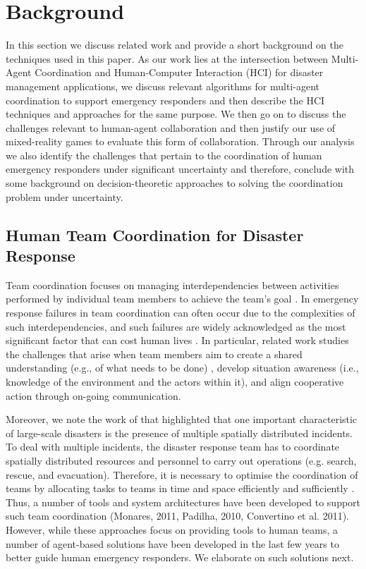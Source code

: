 \section{Background}
In this section we discuss related work and provide a short background on the techniques used in this paper.  As our work lies at the intersection between Multi-Agent Coordination and Human-Computer Interaction (HCI) for disaster management applications, we discuss relevant algorithms for multi-agent coordination to support emergency responders and then describe the HCI techniques and approaches for the same purpose. We then go on to discuss the challenges relevant to human-agent collaboration and then justify our use of mixed-reality games to evaluate this form of collaboration.  Through our analysis we also identify the challenges that pertain to the coordination of human emergency responders under significant uncertainty and therefore, conclude with some background on decision-theoretic approaches to solving the coordination problem under uncertainty.



\subsection{Human Team Coordination for Disaster Response}
Team coordination focuses on managing interdependencies between activities performed  by individual team members to achieve the team's goal \cite[p. 361]{Malone:1990}. In emergency response failures in team coordination can often occur due to the complexities of such interdependencies, and such failures are widely acknowledged as the most significant factor that can cost human lives \cite[p. 2]{Toups et al., 2011}. In particular, related work studies the challenges that arise when team members aim to create a shared understanding (e.g., of what needs to be done) \cite{Convertino2010}, develop situation awareness (i.e., knowledge of the environment and the actors within it), and align cooperative action through on-going communication.  

Moreover, we note the work of \cite{chen:Etal:2005} that highlighted that one important characteristic of large-scale disasters is the presence of multiple spatially distributed incidents. To deal with multiple incidents, the disaster response team has to coordinate spatially distributed resources and personnel to carry out operations (e.g. search, rescue, and evacuation). Therefore, it is necessary to optimise the coordination of teams by allocating tasks to teams in time and space efficiently and sufficiently \cite{Nourjou et al 2011}. Thus, a number of tools and system architectures have been developed to support such team coordination (Monares, 2011, Padilha, 2010, Convertino et al. 2011). However, while these approaches focus on providing tools to human teams, a number of agent-based solutions have been developed in the last few years to better guide human emergency responders. We elaborate on such solutions next.
\

